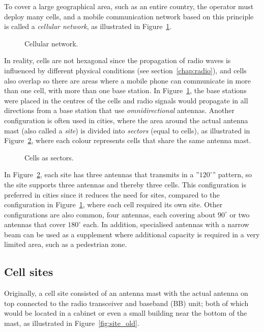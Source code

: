 To cover a large geographical area, such as an entire country, the operator must deploy many cells, and a mobile communication network based on this principle is called a \emph{cellular network}, as illustrated in Figure~\ref{fig:cellular}.
\begin{figure}[htbp]
\centering
{}
\caption{\label{fig:cellular}Cellular network.}
\end{figure}

In reality, cells are not hexagonal since the propagation of radio waves is influenced by different physical conditions (see section~\ref{chap:radio}), and cells also overlap so there are areas where a mobile phone can communicate in more than one cell, \ie with more than one base station. In Figure~\ref{fig:cellular}, the base stations were placed in the centres of the cells and radio signals would propagate in all directions from a base station that use \emph{omnidirectional} antennas. Another configuration is often used in cities, where the area around the actual antenna mast (also called a \emph{site}) is divided into \emph{sectors} (equal to cells), as illustrated in Figure~\ref{fig:sectorized_3}, where each colour represents cells that share the same antenna mast.
\begin{figure}[htbp]
\centering
{}
\caption{\label{fig:sectorized_3}Cells as sectors.}
\end{figure}

In Figure~\ref{fig:sectorized_3}, each site has three antennas that transmits in a ''$120^\circ$'' pattern, so the site supports three antennas and thereby three cells. This configuration is preferred in cities since it reduces the need for sites, compared to the configuration in Figure~\ref{fig:cellular}, where each cell required its own site. Other configurations are also common, \eg four antennas, each covering about $90^\circ$ or two antennas that cover $180^\circ$ each. In addition, specialised antennas with a narrow beam can be used as a supplement where additional capacity is required in a very limited area, such as a pedestrian zone.

\subsection{Cell sites}
Originally, a cell site consisted of an antenna mast with the actual antenna on top connected to the radio transceiver and baseband (BB) unit; both of which would be located in a cabinet or even a small building near the bottom of the mast, as illustrated in Figure~\ref{fig:site_old}.

